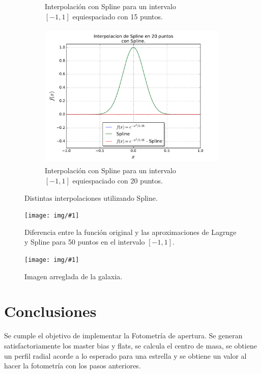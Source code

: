 \documentclass[a4paper, 11pt, spanish]{article}
\newcommand{\fig}[4]{%
	\begin{figure}[!htbp]
		\centering
		\texttt{[image: img/\#1]}
		\caption{#4}
	\end{figure}
}
\begin{document}
\begin{figure}[!hbpt]
\begin{subfigure}{.5\textwidth}
  \caption{Interpolaci\'on con Spline para un intervalo\\ $[-1,1]$ equiespaciado con 15 puntos.}
\end{subfigure}%
\begin{subfigure}{.5\textwidth}
  \centering
  \includegraphics[width=9cm, height=7cm]{img/spline20.pdf}
  \caption{Interpolaci\'on con Spline para un intervalo\\ $[-1,1]$ equiespaciado con 20 puntos.}
\end{subfigure}
\caption{Distintas interpolaciones utilizando Spline.}
\end{figure}

\fig{lagrange_spl_diff.pdf}{18cm}{13cm}{Diferencia entre la funci\'on original y las aproximaciones de Lagrnge y Spline para 50 puntos en el intervalo $[-1, 1]$.}
\fig{fixed_galaxy.pdf}{18cm}{13cm}{Imagen arreglada de la galaxia.}

\section{Conclusiones}

Se cumple el objetivo de implementar la Fotometr\'ia de apertura. Se generan satisfactoriamente los master bias y flats, se calcula el centro de masa, se obtiene un perfil radial acorde a lo esperado para una estrella y se obtiene un valor al hacer la fotometr\'ia con los pasos anteriores.
\end{document}
